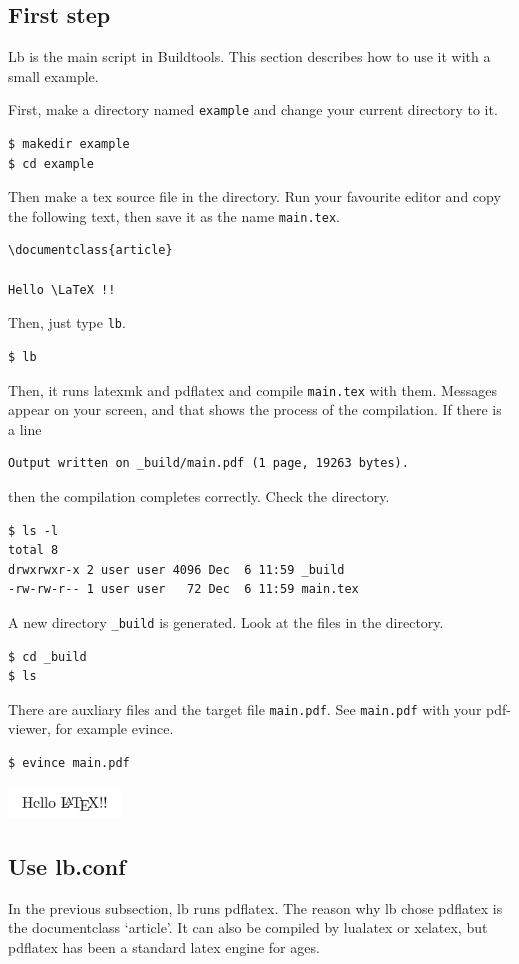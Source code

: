 \subsection{First step}
Lb is the main script in Buildtools.
This section describes how to use it with a small example.

First, make a directory named \verb|example| and change your current directory to it.
\begin{verbatim}
$ makedir example
$ cd example
\end{verbatim}

Then make a tex source file in the directory.
Run your favourite editor and copy the following text, then save it as the name \verb|main.tex|.
\begin{verbatim}
\documentclass{article}

Hello \LaTeX !!

\end{verbatim}

Then, just type \verb|lb|.
\begin{verbatim}
$ lb
\end{verbatim}
Then, it runs latexmk and pdflatex and compile \verb|main.tex| with them.
Messages appear on your screen, and that shows the process of the compilation.
If there is a line 
\begin{verbatim}
Output written on _build/main.pdf (1 page, 19263 bytes).
\end{verbatim}
then the compilation completes correctly.
Check the directory.
\begin{verbatim}
$ ls -l
total 8
drwxrwxr-x 2 user user 4096 Dec  6 11:59 _build
-rw-rw-r-- 1 user user   72 Dec  6 11:59 main.tex
\end{verbatim}
A new directory \verb|_build| is generated.
Look at the files in the directory.
\begin{verbatim}
$ cd _build
$ ls
\end{verbatim}
There are auxliary files and the target file \verb|main.pdf|.
See \verb|main.pdf| with your pdf-viewer, for example evince.
\begin{verbatim}
$ evince main.pdf
\end{verbatim}
\begin{center}
\includegraphics[width=3cm]{hellolatex.png}
\end{center}

\subsection{Use lb.conf}
In the previous subsection, lb runs pdflatex.
The reason why lb chose pdflatex is the documentclass `article'.
It can also be compiled by lualatex or xelatex, but pdflatex has been a standard latex engine for ages.

